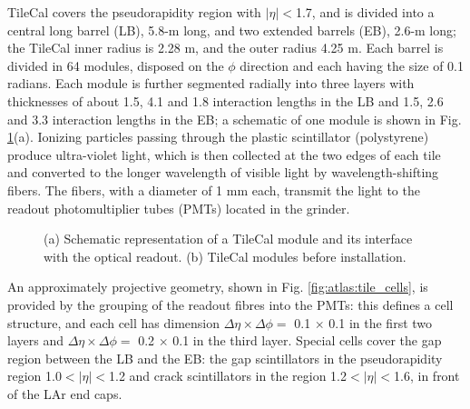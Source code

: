 TileCal covers the pseudorapidity region with $|\eta|<$1.7, and is divided into a central long barrel (LB), 5.8-m long, and two extended barrels (EB), 2.6-m long; the TileCal inner radius is 2.28 m, and the outer radius 4.25 m. Each barrel is divided in 64 modules, disposed on the $\phi$ direction and each having the size of 0.1 radians. Each module is further segmented radially into three layers with thicknesses of about 1.5, 4.1 and 1.8 interaction lengths in the LB and 1.5, 2.6 and 3.3 interaction lengths in the EB; a schematic of one module is shown in Fig. \ref{fig:atlas:tile}(a). Ionizing particles passing through the plastic scintillator (polystyrene) produce ultra-violet light, which is then collected at the two edges of each tile and converted to the longer wavelength of visible light by wavelength-shifting fibers. The fibers, with a diameter of 1 mm each, transmit the light to the readout photomultiplier tubes (PMTs) located in the grinder.

\begin{figure}[ht]
\centering
{}
\caption{(a) Schematic representation of a TileCal module and its interface with the optical readout. (b) TileCal modules before installation.}
\label{fig:atlas:tile}
\end{figure}

An approximately projective geometry, shown in Fig. \ref{fig:atlas:tile_cells}, is provided by the grouping of the readout fibres into the PMTs: this defines a cell structure, and each cell has dimension $\Delta\eta \times \Delta\phi = $ 0.1 $\times$ 0.1 in the first two layers and $\Delta\eta \times \Delta\phi = $ 0.2 $\times$ 0.1 in the third layer. Special cells cover the gap region between the LB and the EB: the gap scintillators in the pseudorapidity region 1.0$<|\eta|<$1.2 and crack scintillators in the region 1.2$<|\eta|<$1.6, in front of the LAr end caps.

